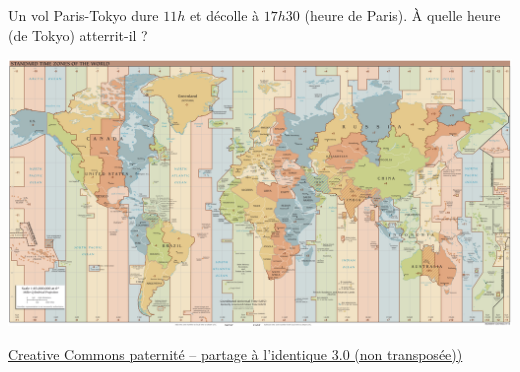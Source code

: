 

\begin{rituel}
    Un vol Paris-Tokyo dure \( 11h\) et décolle à \( 17h30\) (heure de Paris). À quelle heure (de Tokyo) atterrit-il ?


\begin{center}
\includegraphics[width=\linewidth]{TimeZones.pdf}
\end{center}

\href{ http://creativecommons.org/licenses/by-sa/3.0/deed.fr }{Creative Commons paternité – partage à l'identique 3.0 (non transposée))}

\end{rituel}
